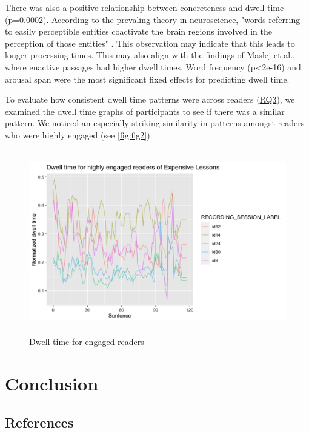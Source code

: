 \documentclass[11pt]{article}
\begin{document}
There was also a positive relationship between concreteness and dwell time (p=0.0002). According to the prevaling theory in neuroscience, "words referring to easily perceptible entities coactivate the brain regions involved in the perception of those entities" \citep{brysbaert2014}. This observation may indicate that this leads to longer processing times. This may also align with the findings of Maslej et al., where enactive passages had higher dwell times. Word frequency (p<2e-16) and arousal span were the most significant fixed effects for predicting dwell time.

To evaluate how consistent dwell time patterns were across readers (\hyperref[subsection:rq3]{RQ3}), we examined the dwell time graphs of participants to see if there was a similar pattern. We noticed an especially striking similarity in patterns amongst readers who were highly engaged (see \autoref{fig:fig2}).

\begin{figure}[ht]
  \includegraphics[height=8cm]{engaged_dt_el}
  \caption{Dwell time for engaged readers}
  \label{fig:fig2}
\end{figure}




\section{Conclusion}


\subsection{References}
\end{document}
